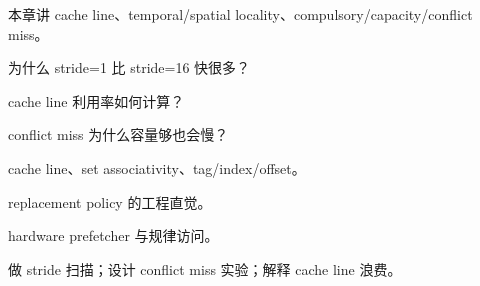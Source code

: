 {本章讲 cache line、temporal/spatial locality、compulsory/capacity/conflict miss。}
{\item 为什么 stride=1 比 stride=16 快很多？
\item cache line 利用率如何计算？
\item conflict miss 为什么容量够也会慢？}
{\item cache line、set associativity、tag/index/offset。
\item replacement policy 的工程直觉。
\item hardware prefetcher 与规律访问。}
{做 stride 扫描；设计 conflict miss 实验；解释 cache line 浪费。}
